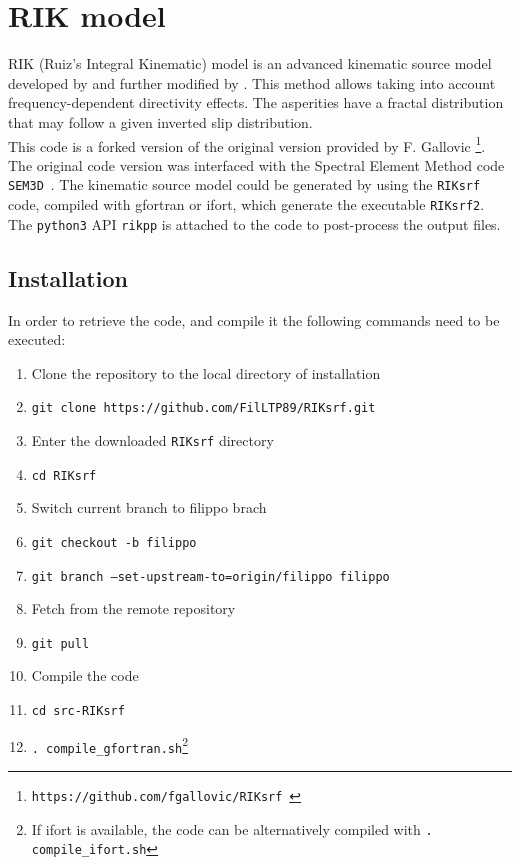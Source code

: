 \chapter{RIK model}
\label{chapRIK}


RIK (Ruiz's Integral Kinematic) model is an advanced kinematic source model developed by \cite{Ruiz2011} and further modified by \cite{Gallovic2016}. This method allows taking into account frequency-dependent directivity effects. The asperities have a fractal distribution that may follow a given inverted slip distribution. \\

This code is a forked version of the original version provided by F. Gallovic \footnote{\texttt{https://github.com/fgallovic/RIKsrf}~\cite{Gallovic2016}}. The original code version was interfaced with the Spectral Element Method code \texttt{SEM3D}~\cite{SEM3D}. The kinematic source model could be generated by using the \texttt{RIKsrf} code, compiled with gfortran or ifort, which generate the executable \texttt{RIKsrf2}. \\ The \texttt{python3} API \texttt{rikpp} is attached to the code to post-process the output files. 

\newpage 

\section{Installation}

In order to retrieve the code, and compile it the following commands need to be executed:
\begin{enumerate}
    \item Clone the repository to the local directory of installation
    \item[] \texttt{git clone https://github.com/FilLTP89/RIKsrf.git}
    \item Enter the downloaded \texttt{RIKsrf} directory
    \item[] \texttt{cd \texttt{RIKsrf}}
    \item Switch current branch to filippo brach
    \item[] \texttt{git checkout -b filippo}
    \item[] \texttt{git branch --set-upstream-to=origin/filippo filippo}
    \item Fetch from the remote repository
    \item[] \texttt{git pull}
    \item Compile the code
    \item[] \texttt{cd src-RIKsrf}
    \item[] \texttt{. compile\_gfortran.sh}\footnote{If ifort is available, the code can be alternatively compiled with \texttt{. compile\_ifort.sh}}
\end{enumerate}



